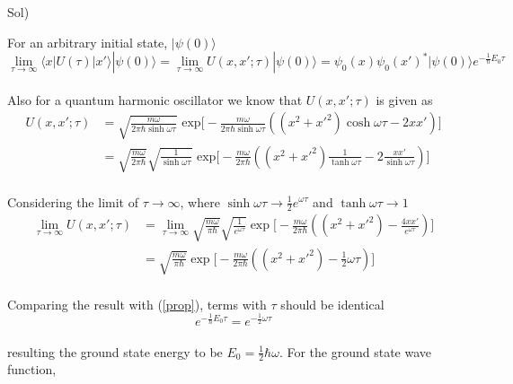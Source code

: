 \documentclass[paper=a4, fontsize=11pt]{scrartcl}
\numberwithin{equation}{section}
\numberwithin{figure}{section}
\numberwithin{table}{section}
\newenvironment{solution}{Sol) \begin{adjustwidth}{0.2in}{}\vspace{0.1in}}{\end{adjustwidth}}
\begin{document}
\begin{solution}
	For an arbitrary initial state, $|\psi(0)\rangle$ \\[3pt]
	\begin{equation}\label{prop}
		\lim_{\tau \to \infty} \langle x |U(\tau)|x' \rangle |\psi(0)\rangle = \lim_{\tau \to \infty} U(x,x';\tau) |\psi(0)\rangle = \psi_0(x) \psi_0(x')^*|\psi(0)\rangle e^{-\frac{1}{\hbar}E_0 \tau}
	\end{equation}\\[3pt]
	Also for a quantum harmonic oscillator we know that $U(x,x';\tau)$ is given as\\[3pt]
	\begin{equation}
	\begin{split}
			U(x,x';\tau) &= \sqrt{\frac{m\omega}{2\pi\hbar \sinh \omega \tau}} \text{ exp} \bigg[ -\frac{m\omega}{2\pi\hbar \sinh \omega \tau}((x^2+x'^2)\cosh \omega\tau - 2 xx')\bigg] \\
			&= \sqrt{\frac{m\omega}{2\pi\hbar }}\sqrt{\frac{1}{\sinh \omega \tau}}\text{ exp} \bigg[ -\frac{m\omega}{2\pi\hbar }((x^2+x'^2)\frac{1}{\tanh \omega \tau}  - 2 \frac{xx'}{\sinh \omega \tau})\bigg]
	\end{split}
	\end{equation}\\[3pt]
	Considering the limit of $\tau \to \infty$, where $\sinh \omega \tau \to \frac{1}{2}e^{\omega\tau}$ and $\tanh \omega \tau \to 1$\\[3pt]
	\begin{equation}
	\begin{split}
			\lim_{\tau \to \infty} U(x,x';\tau) &=\lim_{\tau \to \infty} \sqrt{\frac{m\omega}{\pi\hbar }} \sqrt{\frac{1}{e^{\omega \tau} }} \exp\bigg[ -\frac{m\omega}{2\pi\hbar }((x^2+x'^2)  - \frac{4xx'}{e^{\omega \tau}})\bigg]\\
			&=  \sqrt{\frac{m\omega}{\pi\hbar }}  \exp\bigg[ -\frac{m\omega}{2\pi\hbar }((x^2+x'^2) -\frac{1}{2}\omega\tau)\bigg]
	\end{split}
	\end{equation}\\[3pt]
	Comparing the result with (\ref{prop}), terms with $\tau$ should be identical\\[3pt]
	\begin{equation}
		  e^{-\frac{1}{\hbar}E_0 \tau} = e^{-\frac{1}{2}\omega\tau}
	\end{equation}\\
	resulting the ground state energy to be $E_0 = \frac{1}{2}\hbar\omega$. For the ground state wave function, \\[3pt]

\end{solution}
\end{document}
